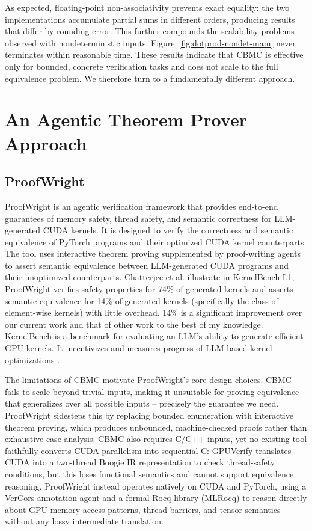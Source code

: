 \documentclass{article}
\begin{document}
As expected, floating-point non-associativity prevents exact equality: the two implementations accumulate partial sums in different orders, producing results that differ by rounding error. This further compounds the scalability problems observed with nondeterministic inputs. Figure~\ref{fig:dotprod-nondet-main} never terminates within reasonable time. These results indicate that CBMC is effective only for bounded, concrete verification tasks and does not scale to the full equivalence problem. We therefore turn to a fundamentally different approach.

\section{An Agentic Theorem Prover Approach}

\subsection{ProofWright}

ProofWright \cite{proofwright2025} is an agentic verification framework that provides end-to-end guarantees of memory safety, thread safety, and semantic correctness for LLM-generated CUDA kernels. It is designed to verify the correctness and semantic equivalence of PyTorch programs and their optimized CUDA kernel counterparts. The tool uses interactive theorem proving supplemented by proof-writing agents to assert semantic equivalence between LLM-generated CUDA programs and their unoptimized counterparts. Chatterjee et al.\cite{proofwright2025} illustrate in KernelBench L1, ProofWright verifies safety properties for 74\% of generated kernels and asserts semantic equivalence for 14\% of generated kernels (specifically the class of element-wise kernels) with little overhead. 14\% is a significant improvement over our current work and that of other work to the best of my knowledge. KernelBench is a benchmark for evaluating an LLM's ability to generate efficient GPU kernels. It incentivizes and measures progress of LLM-based kernel optimizations \cite{ouyang2025kernelbench}.

The limitations of CBMC motivate ProofWright's core design choices. CBMC fails to scale beyond trivial inputs, making it unsuitable for proving equivalence that generalizes over all possible inputs -- precisely the guarantee we need. ProofWright sidesteps this by replacing bounded enumeration with interactive theorem proving, which produces unbounded, machine-checked proofs rather than exhaustive case analysis. CBMC also requires C/C++ inputs, yet no existing tool faithfully converts CUDA parallelism into sequential C: GPUVerify \cite{10.1145/2398857.2384625} translates CUDA into a two-thread Boogie IR representation to check thread-safety conditions, but this loses functional semantics and cannot support equivalence reasoning. ProofWright instead operates natively on CUDA and PyTorch, using a VerCors annotation agent and a formal Rocq library (MLRocq) to reason directly about GPU memory access patterns, thread barriers, and tensor semantics -- without any lossy intermediate translation.
\end{document}
